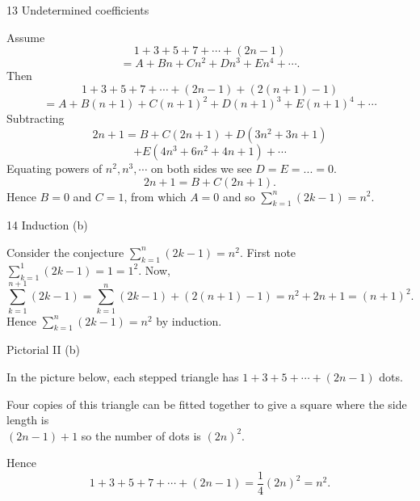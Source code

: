 \documentclass{article}
\begin{document}

13 Undetermined coefficients

Assume
\[1+3+5+7+\cdots + (2n-1) \]
\[= A+Bn+Cn^2+Dn^3+En^4+\cdots .\]
Then
\[  1+3+5+7+\cdots + (2n-1)+(2(n+1)-1) \]
\[ = A+B(n+1)+C(n+1)^2+D(n+1)^3+E(n+1)^4+\cdots\]
Subtracting
\[ 2n+1=B+C(2n+1)+D(3n^2+3n+1)\]
\[ +E(4n^3+6n^2+4n+1) + \cdots\]
Equating powers of \(n^2,n^3,\cdots\) on both sides we see \(D=E=...=0\).
\[ 2n+1=B+C(2n+1).\]
Hence \(B=0\) and \(C=1\), from which \(A=0\) and so \(\sum_{k=1}^n (2k-1) = n^2\).


14 Induction  (b)

Consider the conjecture \(\sum_{k=1}^n (2k-1) = n^2\).
First note \(\sum_{k=1}^1 (2k-1) = 1 = 1^2\).
Now,
\[ \sum_{k=1}^{n+1} (2k-1) = \sum_{k=1}^n (2k-1) + (2(n+1)-1) = n^2 + 2n +1 = (n+1)^2.\]
Hence \(\sum_{k=1}^n (2k-1) = n^2\) by induction.

 Pictorial II (b)

In the picture below, each stepped triangle has
\(1+3+5+\cdots+(2n-1)\) dots.
\begin{center}
\end{center}
Four copies of this triangle can be fitted together to give a square where the side length is \\ \((2n-1)+1\) so the number of dots is \((2n)^2\).

Hence
\[ 1+3+5+7+\cdots+(2n-1) = \frac{1}{4}(2n)^2 = n^2.\]
	
\end{document}
